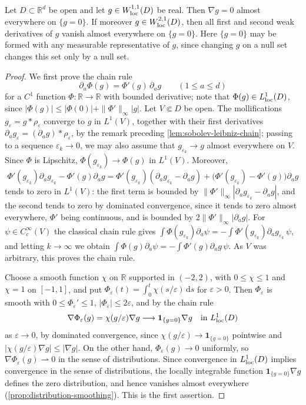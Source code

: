 \begin{lemma}\label{lem:weak-derivative-zero-set}
Let $D\subset\mathbb R^d$ be open and let $g\in W^{1,1}_{\mathrm{loc}}(D)$ be real. Then $\nabla g=0$ almost everywhere on $\{g=0\}$. If moreover $g\in W^{2,1}_{\mathrm{loc}}(D)$, then all first and second weak derivatives of $g$ vanish almost everywhere on $\{g=0\}$. Here $\{g=0\}$ may be formed with any measurable representative of $g$, since changing $g$ on a null set changes this set only by a null set.
\end{lemma}
\begin{proof}
We first prove the chain rule
\[
 \partial_a\Phi(g)=\Phi'(g)\,\partial_a g\qquad(1\le a\le d)
\]
for a $C^1$ function $\Phi\colon\mathbb R\to\mathbb R$ with bounded derivative; note that $\Phi(g)\in L^1_{\mathrm{loc}}(D)$, since $|\Phi(g)|\leq|\Phi(0)|+\|\Phi'\|_\infty|g|$. Let $V\Subset D$ be open. The mollifications $g_\varepsilon=g*\rho_\varepsilon$ converge to $g$ in $L^1(V)$, together with their first derivatives $\partial_ag_\varepsilon=(\partial_ag)*\rho_\varepsilon$, by the remark preceding \cref{lem:sobolev-leibniz-chain}; passing to a sequence $\varepsilon_k\to0$, we may also assume that $g_{\varepsilon_k}\to g$ almost everywhere on $V$. Since $\Phi$ is Lipschitz, $\Phi(g_{\varepsilon_k})\to\Phi(g)$ in $L^1(V)$. Moreover,
\[
 \Phi'(g_{\varepsilon_k})\partial_ag_{\varepsilon_k}-\Phi'(g)\partial_ag
 =\Phi'(g_{\varepsilon_k})(\partial_ag_{\varepsilon_k}-\partial_ag)
  +\bigl(\Phi'(g_{\varepsilon_k})-\Phi'(g)\bigr)\partial_ag
\]
tends to zero in $L^1(V)$: the first term is bounded by $\|\Phi'\|_\infty|\partial_ag_{\varepsilon_k}-\partial_ag|$, and the second tends to zero by dominated convergence, since it tends to zero almost everywhere, $\Phi'$ being continuous, and is bounded by $2\|\Phi'\|_\infty|\partial_ag|$. For $\psi\in C^\infty_c(V)$ the classical chain rule gives $\int\Phi(g_{\varepsilon_k})\partial_a\psi=-\int\Phi'(g_{\varepsilon_k})\partial_ag_{\varepsilon_k}\,\psi$, and letting $k\to\infty$ we obtain $\int\Phi(g)\partial_a\psi=-\int\Phi'(g)\partial_ag\,\psi$. As $V$ was arbitrary, this proves the chain rule.

Choose a smooth function $\chi$ on $\mathbb R$ supported in $(-2,2)$, with $0\le\chi\le1$ and $\chi=1$ on $[-1,1]$, and put $\Phi_\varepsilon(t)=\int_0^t\chi(s/\varepsilon)\,\mathrm ds$ for $\varepsilon>0$. Then $\Phi_\varepsilon$ is smooth with $0\leq\Phi_\varepsilon'\leq1$, $|\Phi_\varepsilon|\le2\varepsilon$, and by the chain rule
\[
 \nabla\Phi_\varepsilon(g)=\chi(g/\varepsilon)\nabla g
       \longrightarrow\mathbf1_{\{g=0\}}\nabla g
       \quad\text{in }L^1_{\mathrm{loc}}(D)
\]
as $\varepsilon\to0$, by dominated convergence, since $\chi(g/\varepsilon)\to\mathbf1_{\{g=0\}}$ pointwise and $|\chi(g/\varepsilon)\nabla g|\leq|\nabla g|$. On the other hand, $\Phi_\varepsilon(g)\to0$ uniformly, so $\nabla\Phi_\varepsilon(g)\rightharpoonup0$ in the sense of distributions. Since convergence in $L^1_{\mathrm{loc}}(D)$ implies convergence in the sense of distributions, the locally integrable function $\mathbf1_{\{g=0\}}\nabla g$ defines the zero distribution, and hence vanishes almost everywhere (\cref{prop:distribution-smoothing}). This is the first assertion.


\end{proof}
